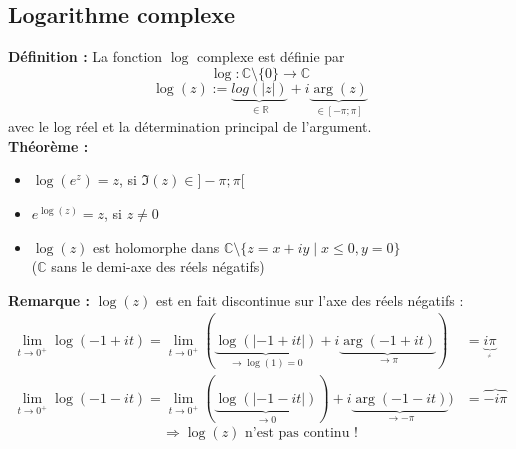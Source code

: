 \subsection{Logarithme complexe}
\textbf{Définition :}
La fonction $\log$ complexe est définie par
$$\log : \mathbb{C}\setminus\{0\}\to\mathbb{C}$$
$$\log(z) := \underbrace{log(|z|)}_{\in\mathbb{R}} + i\underbrace{\arg(z)}_{\in[-\pi;\pi]}$$
avec le log réel et la détermination principal de l'argument. \\
\textbf{Théorème :}
\begin{itemize}
    \item $\log(e^z) = z$, si $\Im(z) \in ]-\pi;\pi[$ 
    \item $e^{\log(z)} = z$, si $z\neq 0$
    \item $\log(z)$ est holomorphe dans $\mathbb{C}\setminus\{z=x+iy\mid x \leq 0, y=0\}$ \\
    ($\mathbb{C}$ sans le demi-axe des réels négatifs)
\end{itemize}
\textbf{Remarque :} $\log(z)$ est en fait discontinue sur l'axe des réels négatifs :
\begin{align*}
    \lim_{t \to 0^+}\log(-1+it) = \lim_{t \to 0^+}(\underbrace{\log(|-1+it|)}_{\to \log(1)=0} + i\underbrace{\arg(-1+it)}_{\to \pi}) &= \underbrace{i\pi}_{_{_{\neq}}} \\
    \lim_{t\to 0^+}\log(-1-it) = \lim_{t \to 0^+}(\underbrace{\log(|-1-it|)}_{\to 0}) + i\underbrace{\arg(-1-it)}_{\to -\pi}) &= \overbrace{-i\pi}
\end{align*}
$$\Rightarrow \log(z)\text{ n'est pas continu !}$$